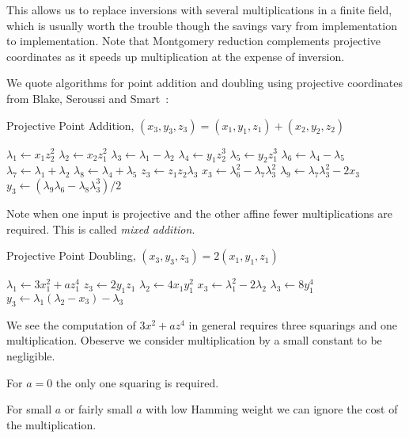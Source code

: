 This allows us to replace inversions with several multiplications in a finite
field, which is usually worth the trouble though the savings
vary from implementation to implementation. Note that Montgomery reduction
complements projective coordinates as it speeds up multiplication at the
expense of inversion.

We quote algorithms for point addition and doubling using projective
coordinates from Blake, Seroussi and Smart~\cite{bss}:

\begin{algorithm}
\caption{Projective Point Addition, $(x_3, y_3, z_3) = (x_1, y_1, z_1) +
(x_2, y_2, z_2)$}
\begin{algorithmic}[1]
\STATE $\lambda_1 \gets x_1 z_2^2$
\STATE $\lambda_2 \gets x_2 z_1^2$
\STATE $\lambda_3 \gets \lambda_1 - \lambda_2$
\STATE $\lambda_4 \gets y_1 z_2^3$
\STATE $\lambda_5 \gets y_2 z_1^3$
\STATE $\lambda_6 \gets \lambda_4 - \lambda_5$
\STATE $\lambda_7 \gets \lambda_1 + \lambda_2$
\STATE $\lambda_8 \gets \lambda_4 + \lambda_5$
\STATE $z_3 \gets z_1 z_2 \lambda_3$
\STATE $x_3 \gets \lambda_6^2 - \lambda_7 \lambda_3^2$
\STATE $\lambda_9 \gets \lambda_7 \lambda_3^2 - 2x_3$
\STATE $y_3 \gets (\lambda_9 \lambda_6 - \lambda_8\lambda_3^3)/2$
\end{algorithmic}
\end{algorithm}

Note when one input is projective and the other affine fewer multiplications
are required. This is called \emph{mixed addition}.

\begin{algorithm}
\caption{Projective Point Doubling, $(x_3, y_3, z_3) = 2(x_1, y_1, z_1)$}
\begin{algorithmic}[1]
\STATE $\lambda_1 \gets 3x_1^2 +a z_1^4$
\STATE $z_3 \gets 2 y_1 z_1$
\STATE $\lambda_2 \gets 4x_1 y_1^2$
\STATE $x_3 \gets \lambda_1^2 - 2\lambda_2$
\STATE $\lambda_3 \gets 8y_1^4$
\STATE $y_3 \gets \lambda_1(\lambda_2 - x_3)-\lambda_3$
\end{algorithmic}
\end{algorithm}

We see the computation of $3x^2 + a z^4$ in general requires three
squarings and one multiplication. Obeserve we consider multiplication by
a small constant to be negligible.

For $a=0$ the only one squaring is required.

For small $a$ or fairly small $a$ with low Hamming weight we can ignore
the cost of the multiplication.

